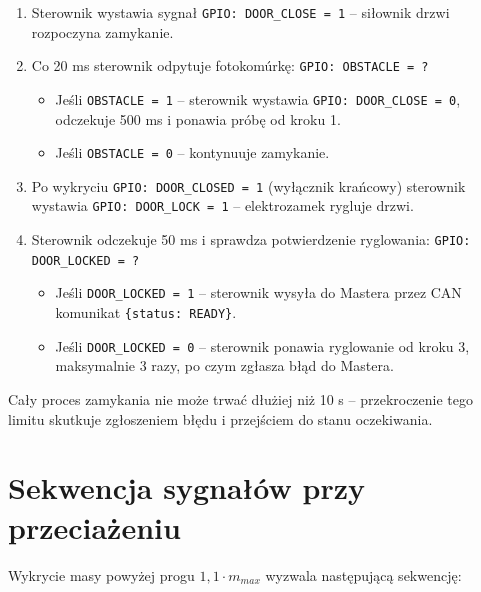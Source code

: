 \documentclass[12pt,a4paper]{article}
\begin{document}
\begin{enumerate}
    \item Sterownik wystawia sygna\l{} \texttt{GPIO: DOOR\_CLOSE = 1} -- si\l ownik drzwi rozpoczyna zamykanie.
    \item Co 20 ms sterownik odpytuje fotokom\'urk\k{e}: \texttt{GPIO: OBSTACLE = ?}
    \begin{itemize}
        \item Je\'sli \texttt{OBSTACLE = 1} -- sterownik wystawia \texttt{GPIO: DOOR\_CLOSE = 0}, odczekuje 500 ms i ponawia pr\'ob\k{e} od kroku 1.
        \item Je\'sli \texttt{OBSTACLE = 0} -- kontynuuje zamykanie.
    \end{itemize}
    \item Po wykryciu \texttt{GPIO: DOOR\_CLOSED = 1} (wy\l\k{a}cznik kra\'ncowy) sterownik wystawia \texttt{GPIO: DOOR\_LOCK = 1} -- elektrozamek rygluje drzwi.
    \item Sterownik odczekuje 50 ms i sprawdza potwierdzenie ryglowania: \texttt{GPIO: DOOR\_LOCKED = ?}
    \begin{itemize}
        \item Je\'sli \texttt{DOOR\_LOCKED = 1} -- sterownik wysy\l a do Mastera przez CAN komunikat \texttt{\{status: READY\}}.
        \item Je\'sli \texttt{DOOR\_LOCKED = 0} -- sterownik ponawia ryglowanie od kroku 3, maksymalnie 3 razy, po czym zg\l asza b\l\k{a}d do Mastera.
    \end{itemize}
\end{enumerate}

Ca\l y proces zamykania nie mo\. ze trwa\'c d\l u\. ziej ni\. z 10 s -- przekroczenie tego limitu skutkuje zg\l oszeniem b\l\k{e}du i przej\'sciem do stanu oczekiwania.


\section{Sekwencja sygna\l\'ow przy przecia\. zeniu}


Wykrycie masy powy\. zej progu $1{,}1 \cdot m_{max}$ wyzwala nast\k{e}puj\k{a}c\k{a} sekwencj\k{e}:
\end{document}
